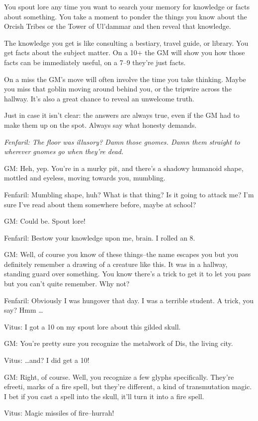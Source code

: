  You spout lore any time you want to search your memory for knowledge or facts about something. You take a moment to ponder the things you know about the Orcish Tribes or the Tower of Ul'dammar and then reveal that knowledge.


 The knowledge you get is like consulting a bestiary, travel guide, or library. You get facts about the subject matter. On a 10+ the GM will show you how those facts can be immediately useful, on a 7--9 they're just facts.


 On a miss the GM's move will often involve the time you take thinking. Maybe you miss that goblin moving around behind you, or the tripwire across the hallway. It's also a great chance to reveal an unwelcome truth.


 Just in case it isn't clear: the answers are always true, even if the GM had to make them up on the spot. Always say what honesty demands.


{\itshape
 Fenfaril: The floor was illusory? Damn those gnomes. Damn them straight to wherever gnomes go when they're dead.


 GM: Heh, yep. You're in a murky pit, and there's a shadowy humanoid shape, mottled and eyeless, moving towards you, mumbling.


 Fenfaril: Mumbling shape, huh? What is that thing? Is it going to attack me? I'm sure I've read about them somewhere before, maybe at school?


 GM: Could be. Spout lore!


 Fenfaril: Bestow your knowledge upon me, brain. I rolled an 8.


 GM: Well, of course you know of these things--the name escapes you but you definitely remember a drawing of a creature like this. It was in a hallway, standing guard over something. You know there's a trick to get it to let you pass but you can't quite remember. Why not?


 Fenfaril: Obviously I was hungover that day. I was a terrible student. A trick, you say? Hmm \ldots 


 Vitus: I got a 10 on my spout lore about this gilded skull.


 GM: You're pretty sure you recognize the metalwork of Dis, the living city.


 Vitus:  \ldots and? I did get a 10!


 GM: Right, of course. Well, you recognize a few glyphs specifically. They're efreeti, marks of a fire spell, but they're different, a kind of transmutation magic. I bet if you cast a spell into the skull, it'll turn it into a fire spell.


 Vitus: Magic missiles of fire--hurrah!
}
